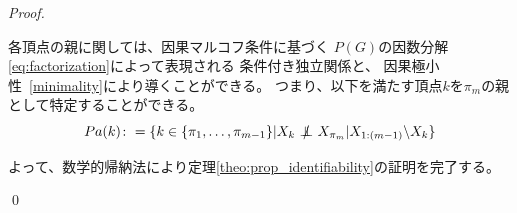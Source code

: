 \begin{proof}
\begin{quote}
\begin{enumerate}[label=(\roman*)]
    \end{enumerate}
  \end{quote}


    各頂点の親に関しては、因果マルコフ条件に基づく
    $P(G)の因数分解$\eqref{eq:factorization}によって表現される
    条件付き独立関係と、
    因果極小性~\eqref{minimality}により導くことができる。
    つまり、以下を満たす頂点$k$を$\pi_m$の親として特定することができる。
    \begin{equation*}
      Pa(k) \colon = \{ k \in \{ \pi_1, \dots, \pi_{m-1} \} |
      X_k \notindep X_{\pi_m} | X_{1:(m-1)} \backslash X_k \}
    \end{equation*}

    よって、数学的帰納法により定理\ref{theo:prop_identifiability}の証明を完了する。

  \qed
\end{proof}
